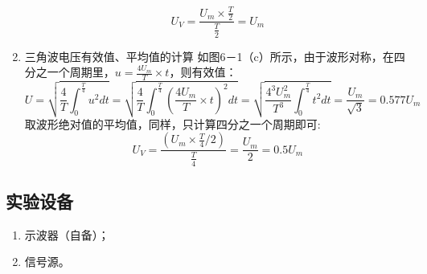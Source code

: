\documentclass[UTF8]{article}
\begin{document}
\begin{enumerate}[label=\textbf{\arabic*}.]
\begin{equation*}
                    U_{V} = \frac{U_m \times \frac{T}{2}}{\frac{T}{2}} = U_m
                \end{equation*}
                \item 三角波电压有效值、平均值的计算
                \newline 如图6－1（c）所示，由于波形对称，在四分之一个周期里，$u = \frac{4U_m}{T} \times t $，则有效值：
                \begin{equation*}
                    U = \sqrt{\frac{4}{T}\int_{0}^{\frac{T}{4}}u^2 dt} 
                    = \sqrt{\frac{4}{T} \int_{0}^{\frac{T}{4}} \left( \frac{4U_m}{T} \times t \right)^2 dt} 
                    = \sqrt{\frac{4^3 U_{m}^{2}}{T^3}\int_{0}^{\frac{T}{4}} t^2 dt}
                    = \frac{U_m}{\sqrt{3}} = 0.577U_m
                \end{equation*}
                取波形绝对值的平均值，同样，只计算四分之一个周期即可:
                \begin{equation*}
                    U_{V} = \frac{\left( U_m \times \frac{T}{4} / 2\right)}{\frac{T}{4}} 
                    = \frac{U_m}{2} = 0.5U_m
                \end{equation*}
            \end{enumerate}
        \subsection{实验设备}
            \begin{enumerate}[label=\textbf{\arabic*}.]
                \item 示波器（自备）；
                \item 信号源。 
            \end{enumerate}
\end{document}
